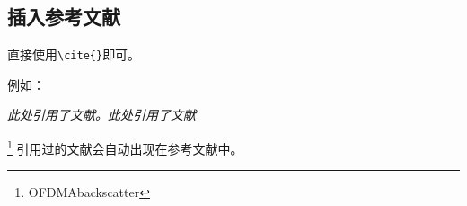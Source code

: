 \documentclass[12pt,hyperref,a4paper,UTF8]{ctexart}
\begin{document}
%
%
%
%
%
%

\subsection{插入参考文献}
直接使用\verb|\cite{}|即可。

例如：


   \textit{ 此处引用了文献\cite{OFDMAbackscatter}。此处引用了文献\cite{DigiScatter}}

\footnote{OFDMAbackscatter}
引用过的文献会自动出现在参考文献中。


\end{document}
